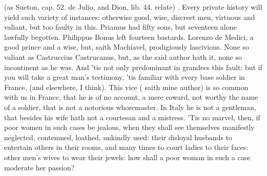  (as Sueton, cap. 52. de Julio, and
Dion, lib. 44. relate) . Every private history will yield such variety of instances:
otherwise good, wise, discreet men, virtuous and valiant, but too
faulty in this. Priamus had fifty sons, but seventeen alone lawfully
begotten. Philippus Bonus left fourteen bastards. Lorenzo de
Medici, a good prince and a wise, but, saith Machiavel,
prodigiously lascivious. None so valiant as Castruccius
Castrucanus, but, as the said author hath it, none so incontinent
as he was. And 'tis not only predominant in grandees this fault: but if
you will take a great man's testimony, 'tis familiar with every base
soldier in France, (and elsewhere, I think). This vice ( saith
mine author) is so common with us in France, that he is of no account,
a mere coward, not worthy the name of a soldier, that is not a
notorious whoremaster. In Italy he is not a gentleman, that besides his
wife hath not a courtesan and a mistress. 'Tis no marvel, then, if poor
women in such cases be jealous, when they shall see themselves
manifestly neglected, contemned, loathed, unkindly used: their disloyal
husbands to entertain others in their rooms, and many times to court
ladies to their faces: other men's wives to wear their jewels: how
shall a poor woman in such a case moderate her passion? 

